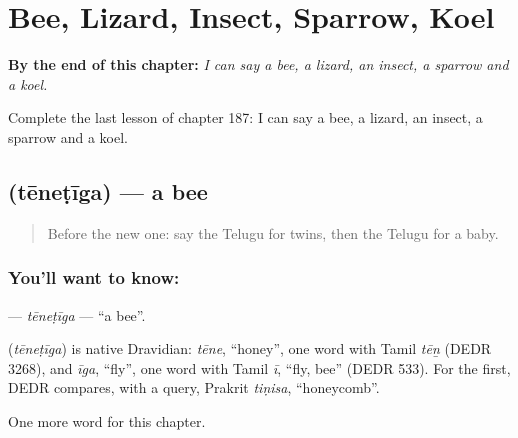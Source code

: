 
\chapter{Bee, Lizard, Insect, Sparrow, Koel}
\label{ch:te-bee-lizard-insect-sparrow-koel}

\begin{chapteropening}
\textbf{By the end of this chapter:} \emph{I can say a bee, a lizard, an insect, a sparrow and a koel.}

Complete the last lesson of chapter 187: I can say a bee, a lizard, an insect, a sparrow and a koel.
\end{chapteropening}

\section[\texorpdfstring{\te{తేనెటీగ} (tēneṭīga)}{తేనెటీగ (tēneṭīga)}]{ (tēneṭīga) — a bee}

\label{lesson:TE-C187-tenetiga}



\begin{quote}
Before the new one: say the Telugu for twins, then the Telugu for a baby.
\end{quote}

\subsection*{You'll want to know: }
\textbf{} — \emph{tēneṭīga} — \textquotedblleft{}a bee\textquotedblright{}.

\begin{cousinweb}
\textbf{} (\emph{tēneṭīga}) is native Dravidian: \emph{tēne}, \textquotedblleft{}honey\textquotedblright{}, one word with Tamil \emph{tēṉ} (DEDR 3268), and \emph{īga}, \textquotedblleft{}fly\textquotedblright{}, one word with Tamil \emph{ī}, \textquotedblleft{}fly, bee\textquotedblright{} (DEDR 533). For the first, DEDR compares, with a query, Prakrit \emph{tiṇisa}, \textquotedblleft{}honeycomb\textquotedblright{}.
\end{cousinweb}

\begin{grammarlens}[title={What you've built}]
One more word for this chapter.
\end{grammarlens}

